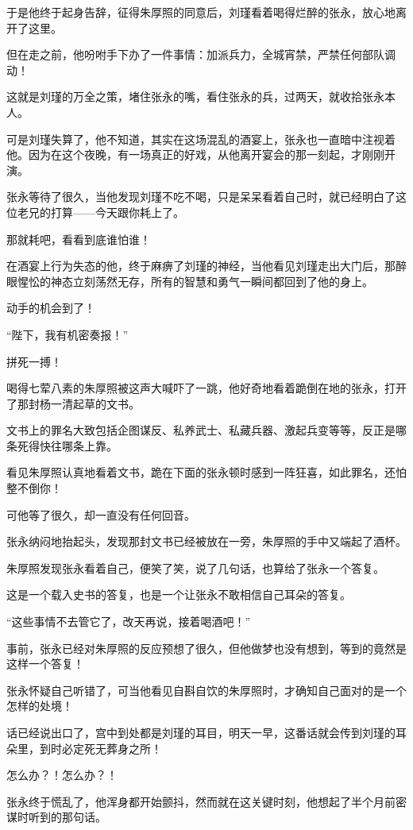 \begin{multicols}{\theparacolNo}
		于是他终于起身告辞，征得朱厚照的同意后，刘瑾看着喝得烂醉的张永，放心地离开了这里。

		但在走之前，他吩咐手下办了一件事情：加派兵力，全城宵禁，严禁任何部队调动！

		这就是刘瑾的万全之策，堵住张永的嘴，看住张永的兵，过两天，就收拾张永本人。

		可是刘瑾失算了，他不知道，其实在这场混乱的酒宴上，张永也一直暗中注视着他。因为在这个夜晚，有一场真正的好戏，从他离开宴会的那一刻起，才刚刚开演。

		张永等待了很久，当他发现刘瑾不吃不喝，只是呆呆看着自己时，就已经明白了这位老兄的打算——今天跟你耗上了。

		那就耗吧，看看到底谁怕谁！

		在酒宴上行为失态的他，终于麻痹了刘瑾的神经，当他看见刘瑾走出大门后，那醉眼惺忪的神态立刻荡然无存，所有的智慧和勇气一瞬间都回到了他的身上。

		动手的机会到了！

		“陛下，我有机密奏报！”

		拼死一搏！

		喝得七荤八素的朱厚照被这声大喊吓了一跳，他好奇地看着跪倒在地的张永，打开了那封杨一清起草的文书。

		文书上的罪名大致包括企图谋反、私养武士、私藏兵器、激起兵变等等，反正是哪条死得快往哪条上靠。

		看见朱厚照认真地看着文书，跪在下面的张永顿时感到一阵狂喜，如此罪名，还怕整不倒你！

		可他等了很久，却一直没有任何回音。

		张永纳闷地抬起头，发现那封文书已经被放在一旁，朱厚照的手中又端起了酒杯。

		朱厚照发现张永看着自己，便笑了笑，说了几句话，也算给了张永一个答复。

		这是一个载入史书的答复，也是一个让张永不敢相信自己耳朵的答复。

		“这些事情不去管它了，改天再说，接着喝酒吧！”

		事前，张永已经对朱厚照的反应预想了很久，但他做梦也没有想到，等到的竟然是这样一个答复！

		张永怀疑自己听错了，可当他看见自斟自饮的朱厚照时，才确知自己面对的是一个怎样的处境！

		话已经说出口了，宫中到处都是刘瑾的耳目，明天一早，这番话就会传到刘瑾的耳朵里，到时必定死无葬身之所！

		怎么办？！怎么办？！

		张永终于慌乱了，他浑身都开始颤抖，然而就在这关键时刻，他想起了半个月前密谋时听到的那句话。


\end{multicols}
